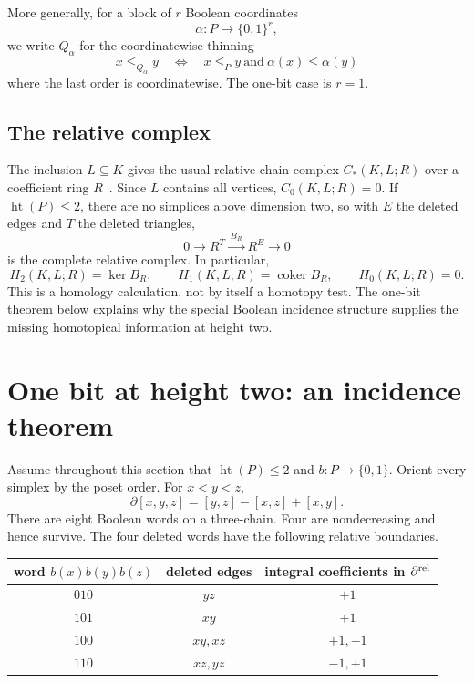 \documentclass[11pt]{article}
\theoremstyle{definition}
\theoremstyle{remark}
\DeclareMathOperator{\posht}{ht}
\begin{document}
More generally, for a block of $r$ Boolean coordinates
\[
  \alpha:P\longrightarrow\{0,1\}^r,
\]
we write $Q_\alpha$ for the coordinatewise thinning
\begin{equation}\label{eq:block-thinning}
  x\le_{Q_\alpha}y
  \quad\Longleftrightarrow\quad
  x\le_Py\ \text{and}\ \alpha(x)\le\alpha(y)
\end{equation}
where the last order is coordinatewise.  The one-bit case is $r=1$.

\subsection{The relative complex}

The inclusion $L\subseteq K$ gives the usual relative chain complex
$C_*(K,L;R)$ over a coefficient ring $R$~\cite{Hatcher2002}.  Since $L$ contains all
vertices, $C_0(K,L;R)=0$.  If $\posht(P)\le2$, there are no simplices above dimension two,
so with $E$ the deleted edges and $T$ the deleted triangles,
\begin{equation}\label{eq:relative-two-layer}
  0\longrightarrow R^T
  \xrightarrow{\,B_R\,}
  R^E\longrightarrow0
\end{equation}
is the complete relative complex.  In particular,
\begin{equation}\label{eq:relative-homology-basic}
  H_2(K,L;R)=\ker B_R,
  \qquad
  H_1(K,L;R)=\operatorname{coker}B_R,
  \qquad H_0(K,L;R)=0.
\end{equation}
This is a homology calculation, not by itself a homotopy test.  The one-bit theorem
below explains why the special Boolean incidence structure supplies the missing
homotopical information at height two.

\section{One bit at height two: an incidence theorem}\label{sec:incidence}

Assume throughout this section that $\posht(P)\le2$ and $b:P\to\{0,1\}$.
Orient every simplex by the poset order.  For $x<y<z$,
\begin{equation}\label{eq:triangle-boundary}
  \partial[x,y,z]=[y,z]-[x,z]+[x,y].
\end{equation}
There are eight Boolean words on a three-chain.  Four are nondecreasing and hence
survive.  The four deleted words have the following relative boundaries.

\begin{center}
\begin{tabular}{@{}ccc@{}}
\toprule
word $b(x)b(y)b(z)$ & deleted edges & integral coefficients in $\partial^{\rm rel}$ \\
\midrule
$010$ & $yz$ & $+1$ \\
$101$ & $xy$ & $+1$ \\
$100$ & $xy,xz$ & $+1,-1$ \\
$110$ & $xz,yz$ & $-1,+1$ \\
\bottomrule
\end{tabular}
\end{center}
\end{document}
